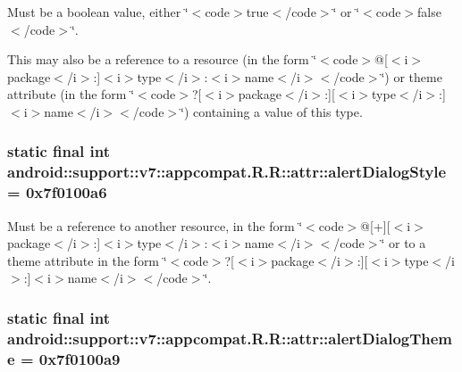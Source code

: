 Must be a boolean value, either \char`\"{}$<$code$>$true$<$/code$>$\char`\"{} or \char`\"{}$<$code$>$false$<$/code$>$\char`\"{}. 

This may also be a reference to a resource (in the form \char`\"{}$<$code$>$@\mbox{[}$<$i$>$package$<$/i$>$:\mbox{]}$<$i$>$type$<$/i$>$:$<$i$>$name$<$/i$>$$<$/code$>$\char`\"{}) or theme attribute (in the form \char`\"{}$<$code$>$?\mbox{[}$<$i$>$package$<$/i$>$:\mbox{]}\mbox{[}$<$i$>$type$<$/i$>$:\mbox{]}$<$i$>$name$<$/i$>$$<$/code$>$\char`\"{}) containing a value of this type. \hypertarget{classandroid_1_1support_1_1v7_1_1appcompat_1_1_r_1_1attr_96a987ed1b99073776a20091632d6254}{
\subsubsection[{alertDialogStyle}]{\setlength{\rightskip}{0pt plus 5cm}static final int android::support::v7::appcompat.R.R::attr::alertDialogStyle = 0x7f0100a6}}
\label{classandroid_1_1support_1_1v7_1_1appcompat_1_1_r_1_1attr_96a987ed1b99073776a20091632d6254}


Must be a reference to another resource, in the form \char`\"{}$<$code$>$@\mbox{[}+\mbox{]}\mbox{[}$<$i$>$package$<$/i$>$:\mbox{]}$<$i$>$type$<$/i$>$:$<$i$>$name$<$/i$>$$<$/code$>$\char`\"{} or to a theme attribute in the form \char`\"{}$<$code$>$?\mbox{[}$<$i$>$package$<$/i$>$:\mbox{]}\mbox{[}$<$i$>$type$<$/i$>$:\mbox{]}$<$i$>$name$<$/i$>$$<$/code$>$\char`\"{}. \hypertarget{classandroid_1_1support_1_1v7_1_1appcompat_1_1_r_1_1attr_d05ae5da2238b8e6999034bdda66da8d}{
\subsubsection[{alertDialogTheme}]{\setlength{\rightskip}{0pt plus 5cm}static final int android::support::v7::appcompat.R.R::attr::alertDialogTheme = 0x7f0100a9}}
\label{classandroid_1_1support_1_1v7_1_1appcompat_1_1_r_1_1attr_d05ae5da2238b8e6999034bdda66da8d}


